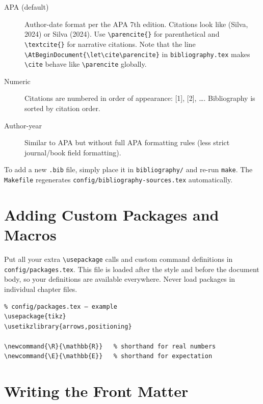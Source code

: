 \begin{description}
  \item[APA (default)] Author-date format per the APA 7th edition.
        Citations look like (Silva, 2024) or Silva (2024).
        Use \texttt{\textbackslash parencite\{\}} for parenthetical and
        \texttt{\textbackslash textcite\{\}} for narrative citations.
        Note that the line \texttt{\textbackslash AtBeginDocument\{\textbackslash let\textbackslash cite\textbackslash parencite\}}
        in \texttt{bibliography.tex} makes \texttt{\textbackslash cite}
        behave like \texttt{\textbackslash parencite} globally.

  \item[Numeric] Citations are numbered in order of appearance: [1], [2], \ldots.
        Bibliography is sorted by citation order.

  \item[Author-year] Similar to APA but without full APA formatting rules
        (less strict journal/book field formatting).
\end{description}

To add a new \texttt{.bib} file, simply place it in \texttt{bibliography/} and
re-run \texttt{make}.  The \texttt{Makefile} regenerates
\texttt{config/bibliography-sources.tex} automatically.

\section{Adding Custom Packages and Macros} \label{sec:packages}

Put all your extra \texttt{\textbackslash usepackage} calls and custom command
definitions in \texttt{config/packages.tex}.  This file is loaded after the
style and before the document body, so your definitions are available everywhere.
Never load packages in individual chapter files.

\begin{verbatim}
% config/packages.tex — example
\usepackage{tikz}
\usetikzlibrary{arrows,positioning}

\newcommand{\R}{\mathbb{R}}   % shorthand for real numbers
\newcommand{\E}{\mathbb{E}}   % shorthand for expectation
\end{verbatim}

\section{Writing the Front Matter} \label{sec:preface}

